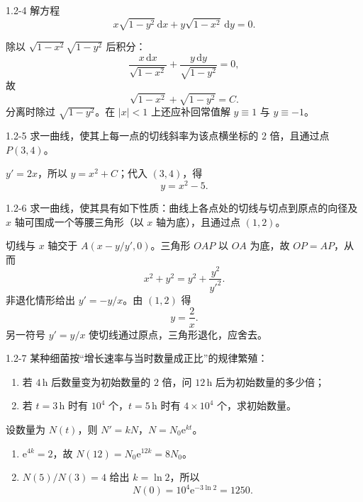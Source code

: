 \documentclass[UTF8,a4paper,11pt]{ctexart}
\newcommand{\dd}{\,\mathrm d}
\newcommand{\e}{\mathrm e}
\begin{document}
\begin{problem}{1.2-4}
解方程
  \[
    x\sqrt{1-y^2}\dd x+y\sqrt{1-x^2}\dd y=0.
  \]
\end{problem}

\begin{solution}
除以 $\sqrt{1-x^2}\sqrt{1-y^2}$ 后积分：
\[
\frac{x\dd x}{\sqrt{1-x^2}}+\frac{y\dd y}{\sqrt{1-y^2}}=0,
\]
故
\[
\boxed{\sqrt{1-x^2}+\sqrt{1-y^2}=C}.
\]
分离时除过 $\sqrt{1-y^2}$。在 $|x|<1$ 上还应补回常值解 $\boxed{y\equiv1}$ 与 $\boxed{y\equiv-1}$。
\end{solution}

\begin{problem}{1.2-5}
求一曲线，使其上每一点的切线斜率为该点横坐标的 2 倍，且通过点 $P(3,4)$。
\end{problem}

\begin{solution}
$y'=2x$，所以 $y=x^2+C$；代入 $(3,4)$，得
\[
\boxed{y=x^2-5}.
\]
\end{solution}

\begin{problem}{1.2-6}
求一曲线，使其具有如下性质：曲线上各点处的切线与切点到原点的向径及 $x$ 轴可围成一个等腰三角形（以 $x$ 轴为底），且通过点 $(1,2)$。
\end{problem}

\begin{solution}
切线与 $x$ 轴交于 $A(x-y/y',0)$。三角形 $OAP$ 以 $OA$ 为底，故 $OP=AP$，从而
\[
x^2+y^2=y^2+\frac{y^2}{y'^2}.
\]
非退化情形给出 $y'=-y/x$。由 $(1,2)$ 得
\[
\boxed{y=\frac2x}.
\]
另一符号 $y'=y/x$ 使切线通过原点，三角形退化，应舍去。
\end{solution}

\begin{problem}{1.2-7}
某种细菌按“增长速率与当时数量成正比”的规律繁殖：
  \begin{enumerate}[label=(\arabic*)]
    \item 若 $4\,\mathrm{h}$ 后数量变为初始数量的 $2$ 倍，问 $12\,\mathrm{h}$ 后为初始数量的多少倍；
    \item 若 $t=3\,\mathrm{h}$ 时有 $10^4$ 个，$t=5\,\mathrm{h}$ 时有 $4\times10^4$ 个，求初始数量。
  \end{enumerate}
\end{problem}

\begin{solution}
设数量为 $N(t)$，则 $N'=kN$，$N=N_0\e^{kt}$。
\begin{enumerate}[label=(\arabic*)]
\item $\e^{4k}=2$，故 $N(12)=N_0\e^{12k}=\boxed{8N_0}$。
\item $N(5)/N(3)=4$ 给出 $k=\ln2$，所以
\[
\boxed{N(0)=10^4\e^{-3\ln2}=1250}.
\]
\end{enumerate}
\end{solution}
\end{document}
